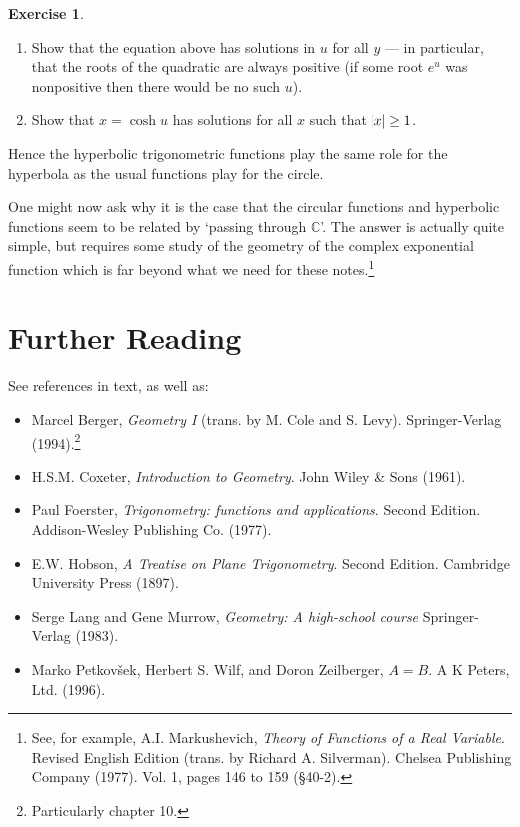 \documentclass[a4paper,leqno]{article}
\numberwithin{equation}{section}
\theoremstyle{definition}
\newtheorem{exercise}[equation]{Exercise}
\theoremstyle{remark}
\begin{document}
\begin{exercise}\leavevmode
  \begin{enumerate}
    \item Show that the equation above has solutions in $ u $ for all $ y $ --- in particular, that the
          roots of the quadratic are always positive (if some root $ e^u $ was nonpositive then there would
          be no such $ u $).
    \item Show that $ x = \cosh u $ has solutions for all $ x $ such that $ \abs{x} \geq 1 $.
  \end{enumerate}
\end{exercise}

Hence the hyperbolic trigonometric functions play the same role for the hyperbola as the usual functions
play for the circle.

One might now ask why it is the case that the circular functions and hyperbolic functions seem to be
related by `passing through $ \mathbb{C} $'. The answer is actually quite simple, but requires some study
of the geometry of the complex exponential function which is far beyond what we need for these notes.\footnote{See, for example, A.I. Markushevich, \emph{Theory of Functions of a Real Variable}. Revised English Edition (trans. by Richard A. Silverman). Chelsea Publishing Company (1977). Vol. 1, pages 146 to 159 (\S40-2).  }

\section*{Further Reading}
See references in text, as well as:
\begin{itemize}
  \item Marcel Berger, \emph{Geometry I} (trans. by M. Cole and S. Levy). Springer-Verlag (1994).\footnote{Particularly chapter 10.}
  \item H.S.M. Coxeter, \emph{Introduction to Geometry}. John Wiley \& Sons (1961).
  \item Paul Foerster, \emph{Trigonometry: functions and applications}. Second Edition. Addison-Wesley Publishing Co. (1977).
  \item E.W. Hobson, \emph{A Treatise on Plane Trigonometry}. Second Edition. Cambridge University Press (1897).
  \item Serge Lang and Gene Murrow, \emph{Geometry: A high-school course} Springer-Verlag (1983).
  \item Marko Petkov\v sek, Herbert S. Wilf, and Doron Zeilberger, \emph{$A = B$}. A K Peters, Ltd. (1996).
\end{itemize}
\end{document}
